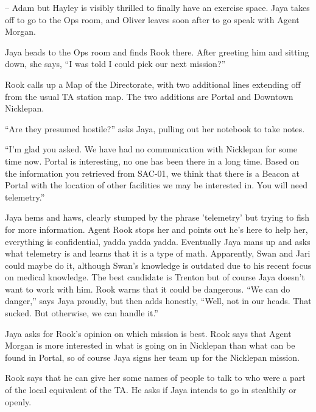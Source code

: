  
--  
    Adam but Hayley is visibly thrilled to finally have an exercise space.  Jaya takes off to go to the Ops room, and Oliver leaves soon after to go speak with Agent Morgan.



Jaya heads to the Ops room and finds Rook there.  After greeting him and sitting down, she says, ``I was told I could pick our next mission?''



Rook calls up a Map of the Directorate, with two additional lines extending off from the usual TA station map.  The two additions are Portal and Downtown Nicklepan.

``Are they presumed hostile?'' asks Jaya, pulling out her notebook to take notes.

``I'm glad you asked.  We have had no communication with Nicklepan for some time now.  Portal is interesting, no one has been there in a long time.  Based on the information you retrieved from SAC-01, we think that there is a Beacon at Portal with the location of other facilities we may be interested in.  You will need telemetry.''



Jaya hems and haws, clearly stumped by the phrase 'telemetry' but trying to fish for more information.  Agent Rook stops her and points out he's here to help her, everything is confidential, yadda yadda yadda.  Eventually Jaya mans up and asks what telemetry is and learns that it is a type of math. Apparently, Swan and Jari could maybe do it, although Swan's knowledge is outdated due to his recent focus on medical knowledge.  The best candidate is Trenton but of course Jaya doesn't want to work with him.  Rook warns that it could be dangerous.  ``We can do danger,'' says Jaya proudly, but then adds honestly, ``Well, not in our heads.  That sucked.  But otherwise, we can handle it.''



Jaya asks for Rook's opinion on which mission is best.  Rook says that Agent Morgan is more interested in what is going on in Nicklepan than what can be found in Portal, so of course Jaya signs her team up for the Nicklepan mission.



Rook says that he can give her some names of people to talk to who were a part of the local equivalent of the TA.  He asks if Jaya intends to go in stealthily or openly.  



